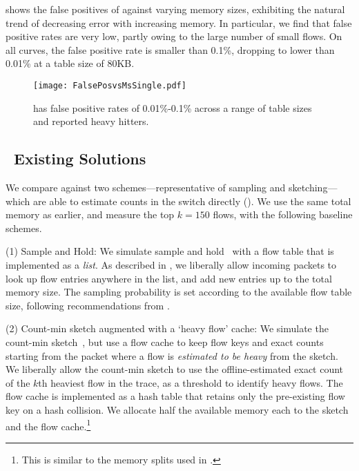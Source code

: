   shows the false positives of
\TheSystem against varying memory sizes, exhibiting the natural trend of
decreasing error with increasing memory. In particular, we find that false
positive rates are very low, partly owing to the large number of small flows. On
all curves, the false positive rate is smaller than 0.1\%, dropping to lower
than 0.01\% at a table size of 80KB.


\begin{figure}[ht]
\texttt{[image: FalsePosvsMsSingle.pdf]}
\caption{\TheSystem has false positive rates of 0.01\%-0.1\% across a range of
  table sizes and reported heavy hitters.}
\label{fig:HPPosvsM}
\end{figure}



\subsection{\TheSystem\ \vs Existing Solutions}\label{subsec:comparisonRelated}

 We compare \TheSystem against two
schemes---representative of sampling and sketching---which are able to estimate
counts in the switch directly (). We use the same total memory
as earlier, and measure the top $k = 150$ flows, with the following baseline
schemes.

\noindent (1) Sample and Hold: We simulate sample and hold~\cite{estan2002new}
with a flow table that is implemented as a {\em list}.  As described in
, we liberally allow incoming packets to look up flow entries
anywhere in the list, and add new entries up to the total memory size. The
sampling probability is set according to the available flow table size,
following recommendations from \cite{estan2002new}.

\noindent (2) Count-min sketch augmented with a `heavy flow' cache: We simulate
the count-min sketch~\cite{cormode2005improved}, but use a flow cache to keep
flow keys and exact counts starting from the packet where a flow is {\em
  estimated to be heavy} from the sketch. We liberally allow the count-min
sketch to use the offline-estimated exact count of the $k$th heaviest
flow in the trace, as a threshold to identify heavy flows. The flow cache is
implemented as a hash table that retains only the pre-existing flow key on a
hash collision. We allocate half the available memory each to the sketch and the
flow cache.\footnote{This is similar to the memory splits used in \cite[page
    288]{estan2002new}.}

